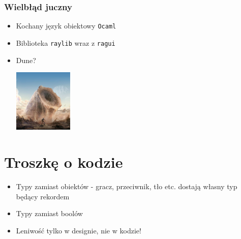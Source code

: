 \documentclass{beamer}
\begin{document}
\begin{frame}
  \frametitle{Wielbłąd juczny}

  \begin{itemize}
    \item Kochany język obiektowy \lstinline{Ocaml}
    \item Biblioteka \lstinline{raylib} wraz z \lstinline{ragui}


  
  \item Dune?

      \includegraphics[height=3cm]{./dune.jpg}
  \end{itemize}
\end{frame}

\section{Troszkę o kodzie}

\begin{frame}
  \begin{itemize}
    \item Typy zamiast obiektów - gracz, przeciwnik, tło etc. dostają własny typ będący rekordem
    \item Typy zamiast boolów
    \item Leniwość tylko w designie, nie w kodzie!
  \end{itemize}
\end{frame}
\end{document}
